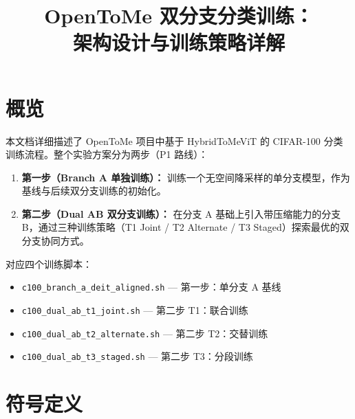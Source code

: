 \documentclass[a4paper,11pt]{article}
\title{\textbf{OpenToMe 双分支分类训练：\\架构设计与训练策略详解}}
\author{}
\date{}
\begin{document}
\maketitle

\section{概览}

本文档详细描述了 OpenToMe 项目中基于 HybridToMeViT 的 CIFAR-100 分类训练流程。整个实验方案分为两步（P1 路线）：

\begin{enumerate}
    \item \textbf{第一步（Branch A 单独训练）：} 训练一个无空间降采样的单分支模型，作为基线与后续双分支训练的初始化。
    \item \textbf{第二步（Dual AB 双分支训练）：} 在分支 A 基础上引入带压缩能力的分支 B，通过三种训练策略（T1 Joint / T2 Alternate / T3 Staged）探索最优的双分支协同方式。
\end{enumerate}

对应四个训练脚本：
\begin{itemize}
    \item \texttt{c100\_branch\_a\_deit\_aligned.sh} — 第一步：单分支 A 基线
    \item \texttt{c100\_dual\_ab\_t1\_joint.sh} — 第二步 T1：联合训练
    \item \texttt{c100\_dual\_ab\_t2\_alternate.sh} — 第二步 T2：交替训练
    \item \texttt{c100\_dual\_ab\_t3\_staged.sh} — 第二步 T3：分段训练
\end{itemize}

\section{符号定义}
\end{document}

